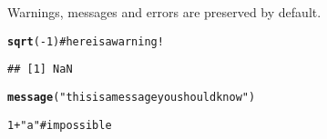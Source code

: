 \documentclass{article}\usepackage{graphicx, color}
\makeatletter
\newcommand{\hlfunctioncall}[1]{\textcolor[rgb]{0.501960784313725,0,0.329411764705882}{\textbf{#1}}}%
\newcommand{\hlstring}[1]{\textcolor[rgb]{0.6,0.6,1}{#1}}%
\newcommand{\hlcomment}[1]{\textcolor[rgb]{0.180392156862745,0.6,0.341176470588235}{#1}}%
\newenvironment{kframe}{%
 \def\at@end@of@kframe{}%
 \ifinner\ifhmode%
  \def\at@end@of@kframe{\end{minipage}}%
  \begin{minipage}{\columnwidth}%
 \fi\fi%
 \def\FrameCommand##1{\hskip\@totalleftmargin \hskip-\fboxsep
 \colorbox{shadecolor}{##1}\hskip-\fboxsep
     \hskip-\linewidth \hskip-\@totalleftmargin \hskip\columnwidth}%
 \MakeFramed {\advance\hsize-\width
   \@totalleftmargin\z@ \linewidth\hsize
   \@setminipage}}%
 {\par\unskip\endMakeFramed%
 \at@end@of@kframe}
\newenvironment{knitrout}{}{} %
\makeatother
\begin{document}
Warnings, messages and errors are preserved by default.

\begin{knitrout}
\color{fgcolor}\begin{kframe}
\begin{alltt}
\hlfunctioncall{sqrt}(-1)  \hlcomment{# here is a warning!}
\end{alltt}


{\ttfamily\noindent\color{warningcolor}{\#\# Warning: NaNs produced}}\begin{verbatim}
## [1] NaN
\end{verbatim}
\begin{alltt}
\hlfunctioncall{message}(\hlstring{"this is a message you should know"})
\end{alltt}


{\ttfamily\noindent\itshape\color{messagecolor}{\#\# this is a message you should know}}\begin{alltt}
1 + \hlstring{"a"}  # impossible
\end{alltt}


{\ttfamily\noindent\bfseries\color{errorcolor}{\#\# Error: non-numeric argument to binary operator}}\end{kframe}
\end{knitrout}
\end{document}

